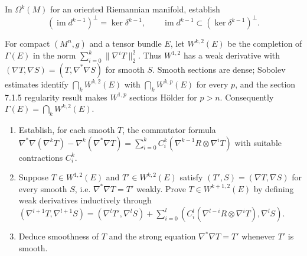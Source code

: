 \begin{remark}
  \label{rem:pet-ch9-exercise-9-6-3}

  In $\Omega^k(M)$ for an oriented Riemannian manifold, establish
  \[
    (\operatorname{im}d^{k-1})^\perp=\ker\delta^{k-1},
    \qquad
    \operatorname{im}d^{k-1}\subset(\ker\delta^{k-1})^\perp.
  \]
\end{remark}

\begin{remark}
  \label{rem:pet-ch9-exercise-9-6-4}

  For compact $(M^n,g)$ and a tensor bundle $E$, let $W^{k,2}(E)$ be the
  completion of $\Gamma(E)$ in the norm
  $\sum_{i=0}^k\|\nabla^iT\|_2^2$.  Thus $W^{1,2}$ has a weak derivative with
  $(\nabla T,\nabla S)=(T,\nabla^*\nabla S)$ for smooth $S$.  Smooth sections
  are dense; Sobolev estimates identify $\bigcap_kW^{k,2}(E)$ with
  $\bigcap_kW^{k,p}(E)$ for every $p$, and the section 7.1.5 regularity result
  makes $W^{1,p}$ sections H\"older for $p>n$.  Consequently
  $\Gamma(E)=\bigcap_kW^{k,2}(E)$.
  \begin{enumerate}
    \item[(1)] Establish, for each smooth $T$, the commutator formula
      $\nabla^*\nabla(\nabla^kT)-\nabla^k(\nabla^*\nabla T)
      =\sum_{i=0}^kC_i^k(\nabla^{k-1}R\otimes\nabla^iT)$ with suitable
      contractions $C_i^k$.
    \item[(2)] Suppose $T\in W^{1,2}(E)$ and $T'\in W^{k,2}(E)$ satisfy
      $(T',S)=(\nabla T,\nabla S)$ for every smooth $S$, i.e.
      $\nabla^*\nabla T=T'$ weakly.  Prove $T\in W^{k+1,2}(E)$ by defining
      weak derivatives inductively through
      $(\nabla^{l+1}T,\nabla^{l+1}S)=(\nabla^lT',\nabla^lS)
      +\sum_{i=0}^l(C_i^l(\nabla^{l-i}R\otimes\nabla^iT),\nabla^lS)$.
    \item[(3)] Deduce smoothness of $T$ and the strong equation
      $\nabla^*\nabla T=T'$ whenever $T'$ is smooth.
  \end{enumerate}
\end{remark}

